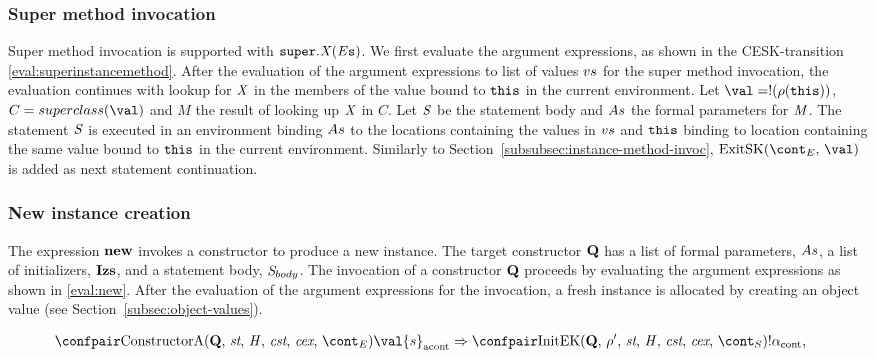 \documentclass[a4paper,oneside]{article}
\newcommand{\synt}[1]{\ensuremath{\text{\textbf{#1}}}}
\DeclareMathOperator{\new}{\synt{new}}
\newcommand{\cesktrans}[2]{\ensuremath{{#1} \Rightarrow {#2}}}
\begin{document}
\subsubsection{Super method invocation}
\label{subsubsec:super-method-invoc}

Super method invocation is supported with $\tt{super}.\mathit{X}(\mathit{E}{s})$.
We first evaluate the argument expressions, as shown in the CESK-transition \eqref{eval:superinstancemethod}.
After the evaluation of the argument expressions to list of values $vs$ for the super method invocation, the evaluation continues with lookup for $\mathit{X}$ in the members of the value bound to $\tt{this}$ in the current environment.
Let $\val = \deref{(\env(\this))}$, $C = \superclass{\val}$ and $M$ the result of looking up $\mathit{X}$ in $C$.
Let $\mathit{S}$ be the statement body and $As$ the formal parameters for $\mathit{M}$.
The statement $\mathit{S}$ is executed in an environment binding $As$ to the locations containing the values in $vs$ and $\tt{this}$ binding to location containing the same value bound to $\tt{this}$ in the current environment.
Similarly to Section~\ref{subsubsec:instance-method-invoc}, $\ExitSK{\val}$ is added as next statement continuation.


\subsubsection{New instance creation}
\label{subsubsec:new-instance}

\newcommand{\Initializer}[1]{\mathrm{Initializer}(#1)}
\newcommand{\SuperInitializer}[2]{\mathrm{SuperInitializer}(#1,\,#2)}
\newcommand{\RedirectingInitializer}[2]{\mathrm{RedirectingInitializer}(#1,\,#2)}

The expression $\new$ invokes a constructor to produce a new instance.
The target constructor $\synt{Q}$ has a list of formal parameters, $As$, a list of initializers, $\synt{Izs}$, and a statement body, $\mathit{S}_{body}$.
The invocation of a constructor $\synt{Q}$ proceeds by evaluating the argument expressions as shown in \eqref{eval:new}.
After the evaluation of the argument expressions for the invocation, a fresh instance is allocated by creating an object value (see Section~\ref{subsec:object-values}).

\begin{align*}
    &\cesktrans%
        {\acontconf{\ConstructorA{\synt{Q}}{\strace}{\econt}}{\val{s}}}%
        {\contconf{\InitK{\synt{Q}}{\env'}{\scont}}{!\loc}},
\end{align*}
\end{document}
